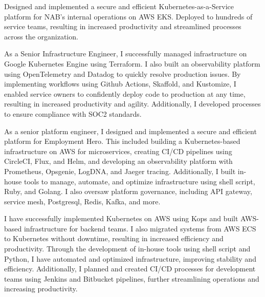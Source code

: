 \documentclass[8pt,a4paper, withhyper]{altacv}
\begin{document}
\begin{paracol}{2}

Designed and implemented a secure and efficient Kubernetes-as-a-Service platform for NAB's internal operations on AWS EKS. Deployed to hundreds of service teams, resulting in increased productivity and streamlined processes across the organization.

\divider

As a Senior Infrastructure Engineer, I successfully managed infrastructure on Google Kubernetes Engine using Terraform. I also built an observability platform using OpenTelemetry and Datadog to quickly resolve production issues. By implementing workflows using Github Actions, Skaffold, and Kustomize, I enabled service owners to confidently deploy code to production at any time, resulting in increased productivity and agility. Additionally, I developed processes to ensure compliance with SOC2 standards.
\divider

As a senior platform engineer, I designed and implemented a secure and efficient platform for Employment Hero. This included building a Kubernetes-based infrastructure on AWS for microservices, creating CI/CD pipelines using CircleCI, Flux, and Helm, and developing an observability platform with Prometheus, Opsgenie, LogDNA, and Jaeger tracing. Additionally, I built in-house tools to manage, automate, and optimize infrastructure using shell script, Ruby, and Golang. I also oversaw platform governance, including API gateway, service mesh, Postgresql, Redis, Kafka, and more.
\divider

I have successfully implemented Kubernetes on AWS using Kops and built AWS-based infrastructure for backend teams. I also migrated systems from AWS ECS to Kubernetes without downtime, resulting in increased efficiency and productivity. Through the development of in-house tools using shell script and Python, I have automated and optimized infrastructure, improving stability and efficiency. Additionally, I planned and created CI/CD processes for development teams using Jenkins and Bitbucket pipelines, further streamlining operations and increasing productivity.
\divider


\end{paracol}
\end{document}
